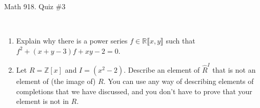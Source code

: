 \documentclass[12pt]{amsart}
\newcommand{\Z}{\mathbb{Z}}
\newcommand{\R}{\mathbb{R}}
\begin{document}
	
	\thispagestyle{empty}
	
	\begin{center}
		\Large{Math 918. Quiz \#3 }\\

	\end{center}
	
	

	
	\
	
	\begin{enumerate}
	
	
	
	\item Explain why there is a power series $f\in \R \llbracket x, y \rrbracket$ such that $f^2 + (x+y -3) f + xy-2 =0$.
		
	\vfill
	
	\item Let $R=\Z[x]$ and $I=(x^2-2)$. Describe an element of $\widehat{R}^I$ that is not an element of (the image of) $R$. You can use any way of describing elements of completions that we have discussed, and you don't have to prove that your element is not in $R$.
	
		\vfill	
	
	\end{enumerate}
	
	
	
\end{document}
